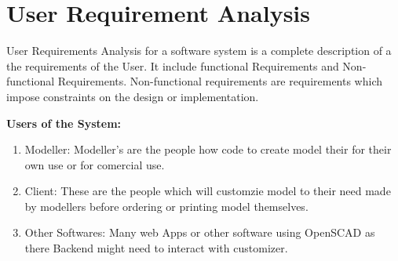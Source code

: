 \section{User Requirement Analysis} 
User Requirements Analysis for a software system is a complete description of a the requirements of the User. It include functional Requirements
and Non-functional Requirements. Non-functional requirements are 
requirements which impose constraints on the design or implementation.

 
{\bf Users of the System:}
	\begin{enumerate}
		\item Modeller: Modeller's are the people how code to create model their for their own use or for comercial use.
		\item Client: These are the people which will customzie model to their need made by modellers before ordering or printing model themselves. 
		\item Other Softwares: Many web Apps or other software using OpenSCAD as there Backend might need to interact with customizer.
		 		
	\end{enumerate}


